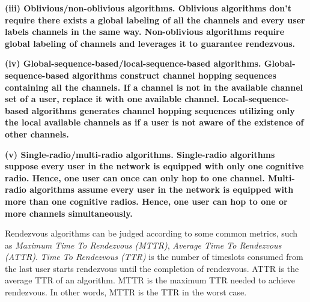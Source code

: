 \documentclass[10pt, conference, letterpaper]{IEEEtran}
\begin{document}
\bfseries (iii) Oblivious/non-oblivious algorithms. \mdseries Oblivious algorithms \cite{Gu2014Fully} \cite{Chen2014A} don't require there exists a global labeling of all the channels and every user labels channels in the same way. Non-oblivious algorithms \cite{Gu2014Fully} \cite{Gu2013Nearly} \cite{Lin2013Enhanced} require global labeling of channels and leverages it to guarantee rendezvous.

\bfseries (iv) Global-sequence-based/local-sequence-based algorithms. \mdseries Global-sequence-based algorithms \cite{Gu2013Nearly} \cite{Yang2016A} construct channel hopping sequences containing all the channels. If a channel is not in the available channel set of a user, replace it with one available channel.
Local-sequence-based algorithms \cite{Wu2014Rendezvous} \cite{Wu2013On} \cite{Gu2014Fully}generates channel hopping sequences utilizing only the local available channels as if a user is not aware of the existence of other channels.

\bfseries (v) Single-radio/multi-radio algorithms. \mdseries Single-radio algorithms \cite{Wu2014Rendezvous} \cite{Wu2013On} \cite{Gu2014Fully}\cite{Gu2014Fully} \cite{Gu2013Nearly} \cite{Lin2013Enhanced} suppose every user in the network is equipped with only one cognitive radio. Hence, one user can once can only hop to one channel. Multi-radio algorithms \cite{Li2014Deterministic} \cite{Yu2015Adjustable} \cite{Yang2016Fully} assume every user in the network is equipped with more than one cognitive radios. Hence, one user can hop to one or more channels simultaneously.

Rendezvous algorithms can be judged according to some common metrics, such as \emph{Maximum Time To Rendezvous (MTTR)}, \emph{Average Time To Rendezvous (ATTR)}. \emph{Time To Rendezvous (TTR)} is the number of timeslots consumed from the last user starts rendezvous until the completion of rendezvous. ATTR is the average TTR of an algorithm. MTTR is the maximum TTR needed to achieve rendezvous. In other words, MTTR is the TTR in the worst case.
\end{document}
